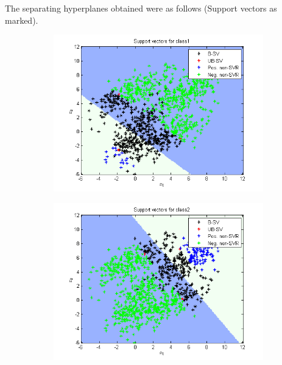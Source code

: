 \documentclass{article}
\begin{document}
The separating hyperplanes obtained were as follows (Support vectors as marked).
\begin{figure}
\begin{subfigure}{.5\textwidth}
  \centering
  \includegraphics[width=.8\linewidth]{Classification/1c/c_linear/sv1}
 
\end{subfigure}%
\begin{subfigure}{.5\textwidth}
  \centering
  \includegraphics[width=.8\linewidth]{Classification/1c/c_linear/sv2}
  
\end{subfigure}
\end{figure}
\end{document}
